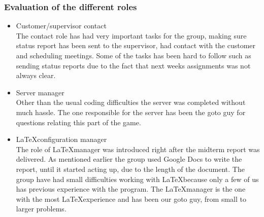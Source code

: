 \subsubsection{Evaluation of the different roles}
\begin{itemize} \setlength{\itemsep}{0cm}\setlength{\parskip}{0cm}
	\item Customer/supervisor contact \\
	The contact role has had very important tasks for the group, making sure status report has been sent to the supervisor,  had contact with the customer and scheduling meetings. Some of the tasks has been hard to follow such as sending status reports due to the fact that next weeks assignments was not always clear. 
	\item Server manager\\
Other than the usual coding difficulties the server was completed without much hassle. The one responsible for the server has been the goto guy for questions relating this part of the game.
	\item \LaTeX configuration manager\\
The role of \LaTeX manager was introduced right after the midterm report was delivered. As mentioned earlier the group used Google Docs to write the report, until it started acting up, due to the length of the document. The group have had small difficulties working with \LaTeX because only a few of us has previous experience with the program. The \LaTeX manager is the one with the most \LaTeX experience and has been our goto guy, from small to larger problems.


\end{itemize}
